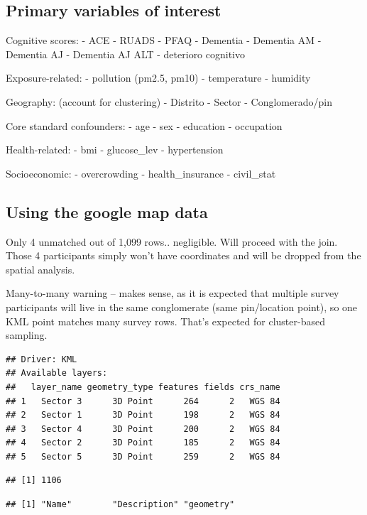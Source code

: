 \documentclass[
  12pt,
]{article}
\begin{document}
\subsection{Primary variables of
interest}\label{primary-variables-of-interest}

Cognitive scores: - ACE - RUADS - PFAQ - Dementia - Dementia AM -
Dementia AJ - Dementia AJ ALT - deterioro cognitivo

Exposure-related: - pollution (pm2.5, pm10) - temperature - humidity

Geography: (account for clustering) - Distrito - Sector -
Conglomerado/pin

Core standard confounders: - age - sex - education - occupation

Health-related: - bmi - glucose\_lev - hypertension

Socioeconomic: - overcrowding - health\_insurance - civil\_stat

\subsection{Using the google map data}\label{using-the-google-map-data}

Only 4 unmatched out of 1,099 rows.. negligible. Will proceed with the
join. Those 4 participants simply won't have coordinates and will be
dropped from the spatial analysis.

Many-to-many warning -- makes sense, as it is expected that multiple
survey participants will live in the same conglomerate (same
pin/location point), so one KML point matches many survey rows. That's
expected for cluster-based sampling.

\begin{verbatim}
## Driver: KML 
## Available layers:
##   layer_name geometry_type features fields crs_name
## 1   Sector 3      3D Point      264      2   WGS 84
## 2   Sector 1      3D Point      198      2   WGS 84
## 3   Sector 4      3D Point      200      2   WGS 84
## 4   Sector 2      3D Point      185      2   WGS 84
## 5   Sector 5      3D Point      259      2   WGS 84
\end{verbatim}

\begin{verbatim}
## [1] 1106
\end{verbatim}

\begin{verbatim}
## [1] "Name"        "Description" "geometry"
\end{verbatim}
\end{document}

